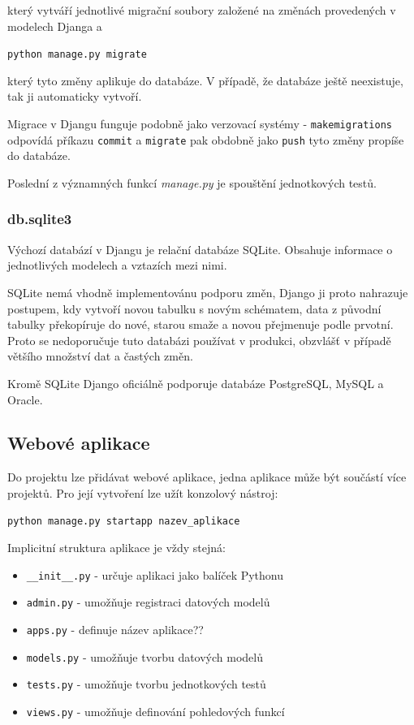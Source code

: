 který vytváří jednotlivé migrační soubory založené na změnách provedených v modelech Djanga a 

\begin{center}
\texttt{python manage.py migrate}
\end{center}

který tyto změny aplikuje do databáze. V případě, že databáze ještě neexistuje, tak ji automaticky vytvoří.

Migrace v Djangu funguje podobně jako verzovací systémy - \texttt{makemigrations} odpovídá příkazu \texttt{commit} a \texttt{migrate} pak obdobně jako \texttt{push} tyto změny propíše do databáze.

Poslední z významných funkcí \textit{manage.py} je spouštění jednotkových testů.

\subsubsection{db.sqlite3}
Výchozí databází v Djangu je relační databáze SQLite. Obsahuje informace o jednotlivých modelech a vztazích mezi nimi.

SQLite nemá vhodně implementovánu podporu změn, Django ji proto nahrazuje postupem, kdy vytvoří novou tabulku s novým schématem, data z původní tabulky překopíruje do nové, starou smaže a novou přejmenuje podle prvotní. Proto se nedoporučuje tuto databázi používat v produkci, obzvlášť v případě většího množství dat a častých změn.

Kromě SQLite Django oficiálně podporuje databáze PostgreSQL, MySQL a Oracle.

\subsection{Webové aplikace}
Do projektu lze přidávat webové aplikace, jedna aplikace může být součástí více projektů. Pro její vytvoření lze užít konzolový nástroj:

\begin{center}
\texttt{python manage.py startapp nazev\_aplikace}
\end{center}

Implicitní struktura aplikace je vždy stejná:

\begin{itemize}
\item \texttt{\_\_init\_\_.py} - určuje aplikaci jako balíček Pythonu
\item \texttt{admin.py} - umožňuje registraci datových modelů
\item \texttt{apps.py} - definuje název aplikace??
\item \texttt{models.py} - umožňuje tvorbu datových modelů
\item \texttt{tests.py} - umožňuje tvorbu jednotkových testů
\item \texttt{views.py} - umožňuje definování pohledových funkcí
\end{itemize}

